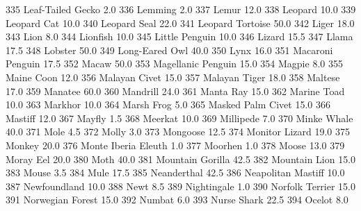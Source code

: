 \documentclass[a4paper]{article}
\begin{document}
\begin{Schunk}
\begin{Soutput}
335              Leaf-Tailed Gecko      2.0
336                        Lemming      2.0
337                          Lemur     12.0
338                        Leopard     10.0
339                    Leopard Cat     10.0
340                   Leopard Seal     22.0
341               Leopard Tortoise     50.0
342                          Liger     18.0
343                           Lion      8.0
344                       Lionfish     10.0
345                 Little Penguin     10.0
346                         Lizard     15.5
347                          Llama     17.5
348                        Lobster     50.0
349                 Long-Eared Owl     40.0
350                           Lynx     16.0
351               Macaroni Penguin     17.5
352                          Macaw     50.0
353             Magellanic Penguin     15.0
354                         Magpie      8.0
355                     Maine Coon     12.0
356                  Malayan Civet     15.0
357                  Malayan Tiger     18.0
358                        Maltese     17.0
359                        Manatee     60.0
360                       Mandrill     24.0
361                      Manta Ray     15.0
362                    Marine Toad     10.0
363                        Markhor     10.0
364                     Marsh Frog      5.0
365              Masked Palm Civet     15.0
366                        Mastiff     12.0
367                         Mayfly      1.5
368                        Meerkat     10.0
369                      Millipede      7.0
370                    Minke Whale     40.0
371                           Mole      4.5
372                          Molly      3.0
373                       Mongoose     12.5
374                 Monitor Lizard     19.0
375                         Monkey     20.0
376            Monte Iberia Eleuth      1.0
377                        Moorhen      1.0
378                          Moose     13.0
379                      Moray Eel     20.0
380                           Moth     40.0
381               Mountain Gorilla     42.5
382                  Mountain Lion     15.0
383                          Mouse      3.5
384                           Mule     17.5
385                    Neanderthal     42.5
386             Neapolitan Mastiff     10.0
387                   Newfoundland     10.0
388                           Newt      8.5
389                    Nightingale      1.0
390                Norfolk Terrier     15.0
391               Norwegian Forest     15.0
392                         Numbat      6.0
393                    Nurse Shark     22.5
394                         Ocelot      8.0

\end{Soutput}
\end{Schunk}
\end{document}
